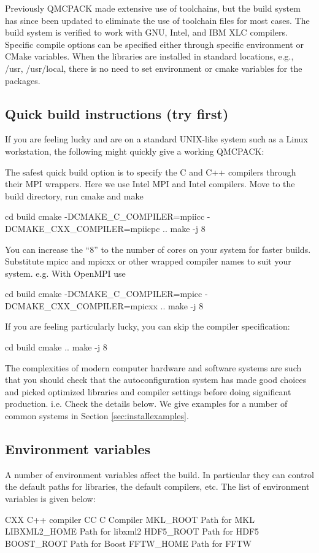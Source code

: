 Previously QMCPACK made extensive use of toolchains, but the build system
has since been updated to eliminate the use of toolchain files for
most cases.  The build system is verified to work with GNU, Intel, and IBM XLC
compilers.  Specific compile options can be specified either through
specific environment or CMake variables.  When the libraries are
installed in standard locations, e.g., /usr, /usr/local, there is no
need to set environment or cmake variables for the packages.

\subsection{Quick build instructions (try first)}
\label{sec:cmakequick}

If you are feeling lucky and are on a standard UNIX-like system such
as a Linux workstation, the following might quickly give a
working QMCPACK:

The safest quick build option is to specify the C and C++ compilers
through their MPI wrappers. Here we use Intel MPI and Intel
compilers. Move to the build directory, run cmake and make

\begin{shade}
cd build
cmake -DCMAKE_C_COMPILER=mpiicc -DCMAKE_CXX_COMPILER=mpiicpc ..
make -j 8
\end{shade}
You can increase the ``8'' to the number of cores on your system for
faster builds. Substitute mpicc and mpicxx or other wrapped compiler names to suit
  your system. e.g. With OpenMPI use

\begin{shade}
cd build
cmake -DCMAKE_C_COMPILER=mpicc -DCMAKE_CXX_COMPILER=mpicxx ..
make -j 8
\end{shade}

If you are feeling particularly lucky, you can skip the compiler specification:

\begin{shade}
cd build
cmake ..
make -j 8
\end{shade}

The complexities of modern computer hardware and software systems are
such that you should check that the autoconfiguration system has made
good choices and picked optimized libraries and compiler settings
before doing significant production. i.e. Check the details below. We
give examples for a number of common systems in Section \ref{sec:installexamples}.

\subsection{Environment variables}
\label{sec:envvar}
A number of environment variables affect the build.  In particular
they can control the default paths for libraries, the default
compilers, etc.  The list of environment variables is given below:
%
\begin{shade}
CXX              C++ compiler
CC               C Compiler
MKL_ROOT         Path for MKL
LIBXML2_HOME     Path for libxml2
HDF5_ROOT        Path for HDF5
BOOST_ROOT       Path for Boost
FFTW_HOME        Path for FFTW
\end{shade}

